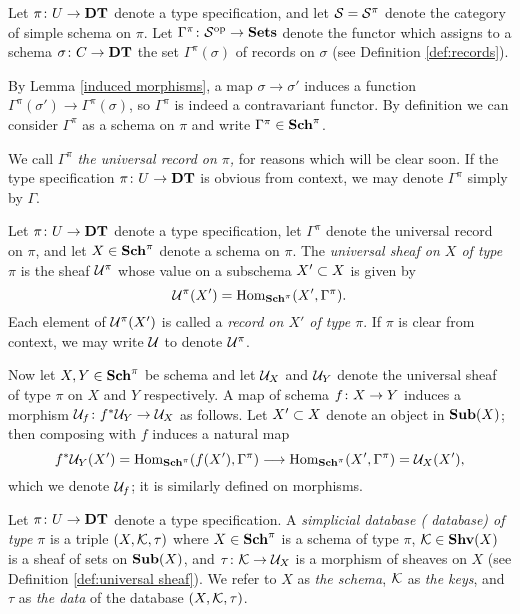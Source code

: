 \documentclass{amsart}
\def\DT{{\bf DT}}
\def\Sch{{\bf Sch}}
\def\Sub{{\bf Sub}}
\begin{document}
\begin{example}\label{ex:universal record}

Let $\pi\taking U\to\DT$ denote a type specification, and let $\mcS=\mcS^\pi$ denote the category of simple schema on $\pi$.  Let $\Gamma^\pi\taking\mcS\op\to\Sets$ denote the functor which assigns to a schema $\sigma\taking C\to\DT$ the set $\Gamma^\pi(\sigma)$ of records on $\sigma$ (see Definition \ref{def:records}).

By Lemma \ref{induced morphisms}, a map $\sigma\to\sigma'$ induces a function $\Gamma^\pi(\sigma')\to\Gamma^\pi(\sigma)$, so $\Gamma^\pi$ is indeed a contravariant functor.  By definition we can consider $\Gamma^\pi$ as a schema on $\pi$ and write $\Gamma^\pi\in\Sch^\pi$.

We call $\Gamma^\pi$ {\em the universal record on $\pi$,} for reasons which will be clear soon.  If the type specification $\pi\taking U\to\DT$ is obvious from context, we may denote $\Gamma^\pi$ simply by $\Gamma$.  

\end{example}


\begin{definition}\label{def:universal sheaf}

Let $\pi\taking U\to\DT$ denote a type specification, let $\Gamma^\pi$ denote the universal record on $\pi$, and let $X\in\Sch^\pi$ denote a schema on $\pi$.  The {\em universal sheaf on $X$ of type $\pi$} is the sheaf $\mcU^\pi$ whose value on a subschema $X'\ss X$ is given by $$\mcU^\pi(X')=\Hom_{\Sch^\pi}(X',\Gamma^\pi).$$  Each element of $\mcU^\pi(X')$ is called a {\em record on $X'$ of type $\pi$}.  If $\pi$ is clear from context, we may write $\mcU$ to denote $\mcU^\pi$.

Now let $X,Y\in\Sch^\pi$ be schema and let $\mcU_X$ and $\mcU_Y$ denote the universal sheaf of type $\pi$ on $X$ and $Y$ respectively.  A map of schema $f\taking X\to Y$ induces a morphism $\mcU_f\taking f^*\mcU_Y\to\mcU_X$ as follows.  Let $X'\ss X$ denote an object in $\Sub(X)$; then composing with $f$ induces a natural map $$f^*\mcU_Y(X')=\Hom_{\Sch^\pi}(f(X'),\Gamma^\pi)\too\Hom_{\Sch^\pi}(X',\Gamma^\pi)=\mcU_X(X'),$$ which we denote $\mcU_f$; it is similarly defined on morphisms.

\end{definition}

\begin{definition}\label{def:database objects}

Let $\pi\taking U\to\DT$ denote a type specification.  A {\em simplicial database ( database) of type $\pi$} is a triple $(X,\mcK,\tau)$ where $X\in\Sch^\pi$ is a schema of type $\pi$, $\mcK\in\Shv(X)$ is a sheaf of sets on $\Sub(X)$, and $\tau\taking\mcK\to\mcU_X$ is a morphism of sheaves on $X$ (see Definition \ref{def:universal sheaf}).  We refer to $X$ as {\em the schema}, $\mcK$ as {\em the keys}, and $\tau$ as {\em the data} of the database $(X,\mcK,\tau)$.

\end{definition}
\end{document}
